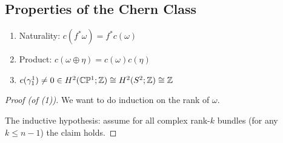 \subsection{Properties of the Chern Class}

\begin{proposition}
\begin{enumerate}
\item Naturality: $c(f^{*}\omega)=f^{*}c(\omega)$
\item Product: $c(\omega\oplus\eta)=c(\omega)c(\eta)$
\item $c(\gamma^{1}_{1})\neq0\in H^{2}(\mathbb{C}\mathbb{P}^{1};\mathbb{Z})\cong H^{2}(S^{2};\mathbb{Z})\cong\mathbb{Z}$
\end{enumerate}
\end{proposition}

\begin{proof}[Proof (of (1))]
We want to do induction on the rank of $\omega$.

The inductive hypothesis: assume for all complex rank-$k$ bundles (for
any $k\leq n-1$) the claim holds.


\end{proof}
